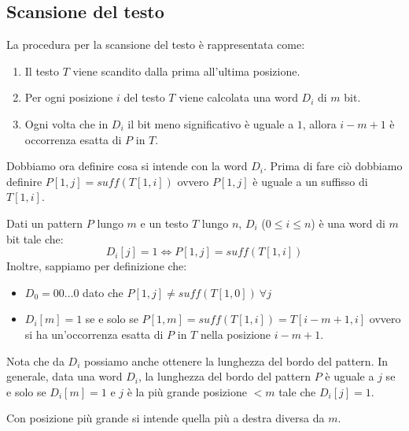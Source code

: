 \subsection{Scansione del testo}
La procedura per la scansione del testo è rappresentata come:
\begin{enumerate}
    \item Il testo $T$ viene scandito dalla prima all'ultima posizione.
    \item Per ogni posizione $i$ del testo $T$ viene calcolata una word $D_i$ di
          $m$ bit.
    \item Ogni volta che in $D_i$ il bit meno significativo è uguale a $1$, allora
          $i - m + 1$ è occorrenza esatta di $P$ in $T$.
\end{enumerate}
Dobbiamo ora definire cosa si intende con la word $D_i$. Prima di fare ciò dobbiamo
definire $P[1,j] = suff(T[1,i])$ ovvero $P[1,j]$ è uguale a un suffisso di $T[1,i]$.
\begin{definizione}
    Dati un pattern $P$ lungo $m$ e un testo $T$ lungo $n$, $D_i$ ($0 \leq i \leq
        n$) è una word di $m$ bit tale che:
    \begin{equation}
        D_i[j] = 1 \iff P[1,j] = suff(T[1,i])
    \end{equation}
    Inoltre, sappiamo per definizione che:
    \begin{itemize}
        \item $D_0 = 00\dots0$ dato che $P[1, j] \neq suff(T[1, 0]) \ \forall j$
        \item $D_i[m] = 1$ se e solo se $P[1, m] = suff(T[1, i]) = T[i - m + 1,
                          i]$ ovvero si ha un'occorrenza esatta di $P$ in $T$
              nella posizione $i - m + 1$.
    \end{itemize}
\end{definizione}
\begin{nota}
    Nota che da $D_i$ possiamo anche ottenere la lunghezza del bordo del pattern.
    In generale, data una word $D_i$, la lunghezza del bordo del pattern $P$ è
    uguale a $j$ se e solo se $D_i[m] = 1$ e $j$ è la più grande posizione $< m$
    tale che $D_i[j] = 1$.

    Con posizione più grande si intende quella più a destra diversa da $m$.
\end{nota}
